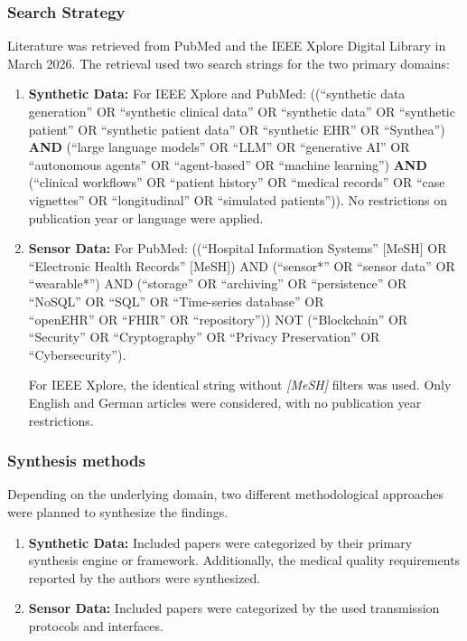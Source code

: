 \subsubsection*{Search Strategy}
Literature was retrieved from PubMed and the IEEE Xplore Digital Library in March 2026. The retrieval used two search strings for the two primary domains:
\begin{enumerate}
    \item \textbf{Synthetic Data:} For IEEE Xplore and PubMed: ((\enquote{synthetic data generation} OR \enquote{synthetic clinical data} OR \enquote{synthetic data} OR \enquote{synthetic patient} OR \enquote{synthetic patient data} OR \enquote{synthetic EHR} OR \enquote{Synthea})
    \textbf{AND}
    (\enquote{large language models} OR \enquote{LLM} OR \enquote{generative AI} OR \enquote{autonomous agents} OR \enquote{agent-based} OR \enquote{machine learning})
    \textbf{AND}
    (\enquote{clinical workflows} OR \enquote{patient history} OR \enquote{medical records} OR \enquote{case vignettes} OR \enquote{longitudinal} OR \enquote{simulated patients})).
    No restrictions on publication year or language were applied.
    
    \item \textbf{Sensor Data:} For PubMed: ((\enquote{Hospital Information Systems} [MeSH] OR \enquote{Electronic Health Records} [MeSH]) 
    AND (\enquote{sensor*} OR \enquote{sensor data} OR \enquote{wearable*}) 
    AND (\enquote{storage} OR \enquote{archiving} OR \enquote{persistence} OR \enquote{NoSQL} OR \enquote{SQL} OR \enquote{Time-series database} OR \\\enquote{openEHR} OR \enquote{FHIR} OR \enquote{repository})) 
    NOT (\enquote{Blockchain} OR \enquote{Security} OR \enquote{Cryptography} OR \enquote{Privacy Preservation} OR \enquote{Cybersecurity}).

    For IEEE Xplore, the identical string without \textit{[MeSH]} filters was used. Only English and German articles were considered, with no publication year restrictions.
\end{enumerate}


\subsubsection*{Synthesis methods}
\begin{sloppypar}
Depending on the underlying domain, two different methodological approaches were planned to synthesize the findings.
\end{sloppypar}
\begin{enumerate}
\item \textbf{Synthetic Data:} Included papers were categorized by their primary synthesis engine or framework. Additionally, the medical quality requirements reported by the authors were synthesized.
\item \textbf{Sensor Data:} Included papers were categorized by the used transmission protocols and interfaces.
\end{enumerate}

